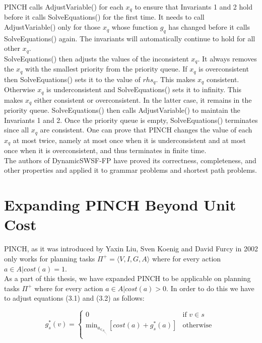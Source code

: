 PINCH calls AdjustVariable() for each $x_q$ to ensure that Invariants 1 and 2 hold before it calls SolveEquations() for the first time. It needs to call AdjustVariable() only for those $x_q$ whose function $g_q$ has changed before it calls SolveEquations() again. The invariants will automatically continue to hold for all other $x_q$.\cite{main} \\

SolveEquations() then adjusts the values of the inconsistent $x_q$. It always removes the $x_q$ with the smallest priority from the priority queue. If $x_q$ is overconsistent then SolveEquations() sets it to the value of $rhs_q$. This makes $x_q$ consistent. Otherwise $x_q$ is underconsistent and SolveEquations() sets it to infinity. This makes $x_q$ either consistent or overconsistent. In the latter case, it remains in the priority queue. SolveEquations() then calls AdjustVariable() to maintain the Invariants 1 and 2. Once the priority queue is empty, SolveEquations() terminates since all $x_q$ are consistent. One can prove that PINCH changes the value of each $x_q$ at most twice, namely at most once when it is underconsistent and at most once when it is overconsistent, and thus terminates in finite time. \cite{main} \cite{swsf} \\

The authors of DynamicSWSF-FP have proved its correctness, completeness, and other properties and applied it to grammar problems and shortest path problems. \cite{swsf}\\
\newpage
\section{Expanding PINCH Beyond Unit Cost}
PINCH, as it was introduced by Yaxin Liu, Sven Koenig and David Furcy in 2002 only works for planning tasks $\Pi^+ = \langle V, I, G, A \rangle$ where for every action $a \in A|cost(a)=1$. \cite{main}\\

As a part of this thesis, we have expanded PINCH to be applicable on planning tasks $\Pi^+$ where for every action $a \in A|cost(a)>0$. In order to do this we have to adjust equations (3.1) and (3.2) as follows:

\begin{equation}
 g^*_s(v) = 
  \begin{cases} 
   0 & \text{if } v \in s \\
   \text{min}_a_\in_A_|_v_\in_a_d_d_(_a_) [cost(a) + g^*_s(a)]       & \text{otherwise } 
  \end{cases}
\end{equation}

